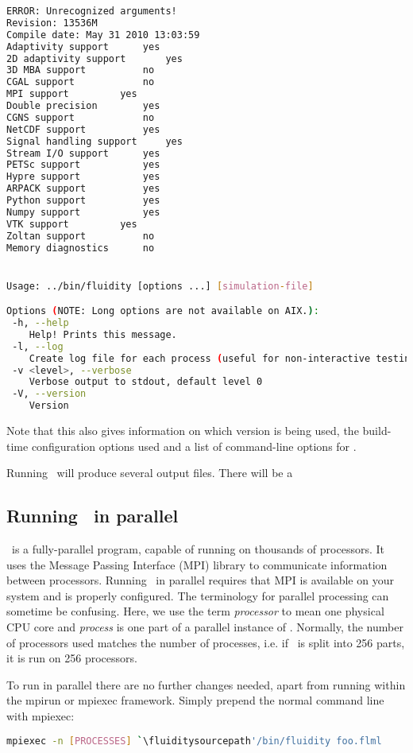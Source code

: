 \begin{lstlisting}[language=Bash]
ERROR: Unrecognized arguments!
Revision: 13536M
Compile date: May 31 2010 13:03:59
Adaptivity support		yes
2D adaptivity support		yes
3D MBA support			no
CGAL support			no
MPI support			yes
Double precision		yes
CGNS support			no
NetCDF support			yes
Signal handling support		yes
Stream I/O support		yes
PETSc support			yes
Hypre support			yes
ARPACK support			yes
Python support			yes
Numpy support			yes
VTK support			yes
Zoltan support			no
Memory diagnostics		no


Usage: ../bin/fluidity [options ...] [simulation-file]

Options (NOTE: Long options are not available on AIX.):
 -h, --help
	Help! Prints this message.
 -l, --log
	Create log file for each process (useful for non-interactive testing). Sets default value for -v to 2.
 -v <level>, --verbose
	Verbose output to stdout, default level 0
 -V, --version
	Version
\end{lstlisting}

Note that this also gives information on which version is being used, the build-time 
configuration options used and a list of command-line options for \fluidity. 

Running \fluidity\ will produce several output files. There will be a 

\subsection{Running \fluidity\ in parallel}
\label{sect:running_fluidity_in_parallel}

\fluidity\ is a fully-parallel program, capable of running on thousands of processors. 
It uses the Message Passing Interface (MPI) library to communicate information between 
processors. Running \fluidity\ in parallel requires that MPI is available on your system
and is properly configured. The terminology for parallel processing can sometime be confusing.
Here, we use the term \emph{processor} to mean one physical CPU core and \emph{process} is one part
of a parallel instance of \fluidity. Normally, the number of processors used matches
the number of processes, i.e. if \fluidity\ is split into 256 parts, it is run on 256 processors.

To run in parallel there are no further changes needed, apart from running \fluidity
within the mpirun or mpiexec framework. Simply prepend the normal command line with mpiexec:
\begin{lstlisting}[language=bash]
mpiexec -n [PROCESSES] `\fluiditysourcepath'/bin/fluidity foo.flml
\end{lstlisting}

